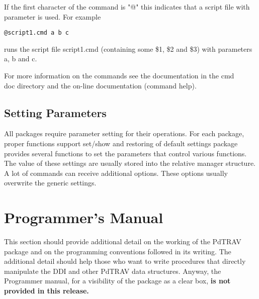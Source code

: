 If the first character of the command is "@" this indicates that a script
file with parameter is used.
For example
{\small
\begin{verbatim}
@script1.cmd a b c
\end{verbatim}
}
runs the script file script1.cmd (containing some \$1, \$2 and \$3) with
parameters a, b and c.

For more information on the commands see the documentation in the {\sf cmd\\doc}
directory and the on-line documentation (command {\sf help}).


\subsection{Setting Parameters}

All packages require parameter setting for their operations.
For each package, proper functions support set/show and restoring of default
settings package provides several functions to set the parameters that control
various functions.
The value of these settings are usually stored into the relative manager
structure.
A lot of commands can receive additional options.
These options usually overwrite the generic settings.


%


\section{Programmer's Manual} 

This section should provide additional detail on the working of the PdTRAV
package and on the programming conventions followed in its writing.
The additional detail should help those who want to write procedures that
directly manipulate the DDI and other PdTRAV data structures. 
Anyway, the Programmer manual, for a visibility of the package as a clear
box, {\bf is not provided in this release.} 

